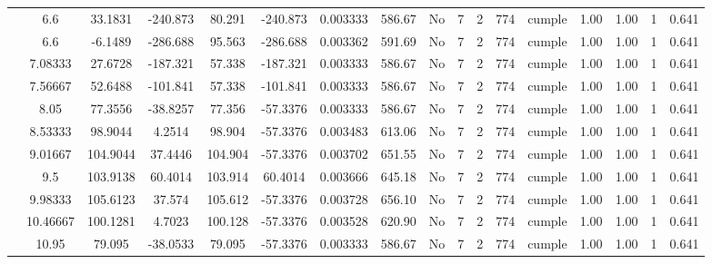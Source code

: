 \begin{table}[H]
{\begin{tabular}{|c|c|c|c|c|c|c|c|c|c|c|c|c|c|c|c|c|}
\cline{2-17}        & \cellcolor[rgb]{ .851,  .882,  .949}6.6 & 33.1831 & -240.873 & 80.291 & -240.873 & 0.003333 & 586.67 & No  & 7   & 2   & 774 & \cellcolor[rgb]{ .776,  .937,  .808}cumple & 1.00 & 1.00 & 1   & 0.641 \bigstrut\\
\cline{2-17}        & \cellcolor[rgb]{ .851,  .882,  .949}6.6 & -6.1489 & -286.688 & 95.563 & -286.688 & 0.003362 & 591.69 & No  & 7   & 2   & 774 & \cellcolor[rgb]{ .776,  .937,  .808}cumple & 1.00 & 1.00 & 1   & 0.641 \bigstrut\\
\cline{2-17}        & 7.08333 & 27.6728 & -187.321 & 57.338 & -187.321 & 0.003333 & 586.67 & No  & 7   & 2   & 774 & \cellcolor[rgb]{ .776,  .937,  .808}cumple & 1.00 & 1.00 & 1   & 0.641 \bigstrut\\
\cline{2-17}        & 7.56667 & 52.6488 & -101.841 & 57.338 & -101.841 & 0.003333 & 586.67 & No  & 7   & 2   & 774 & \cellcolor[rgb]{ .776,  .937,  .808}cumple & 1.00 & 1.00 & 1   & 0.641 \bigstrut\\
\cline{2-17}        & 8.05 & 77.3556 & -38.8257 & 77.356 & -57.3376 & 0.003333 & 586.67 & No  & 7   & 2   & 774 & \cellcolor[rgb]{ .776,  .937,  .808}cumple & 1.00 & 1.00 & 1   & 0.641 \bigstrut\\
\cline{2-17}        & 8.53333 & 98.9044 & 4.2514 & 98.904 & -57.3376 & 0.003483 & 613.06 & No  & 7   & 2   & 774 & \cellcolor[rgb]{ .776,  .937,  .808}cumple & 1.00 & 1.00 & 1   & 0.641 \bigstrut\\
\cline{2-17}        & 9.01667 & 104.9044 & 37.4446 & 104.904 & -57.3376 & 0.003702 & 651.55 & No  & 7   & 2   & 774 & \cellcolor[rgb]{ .776,  .937,  .808}cumple & 1.00 & 1.00 & 1   & 0.641 \bigstrut\\
\cline{2-17}        & 9.5 & 103.9138 & 60.4014 & 103.914 & 60.4014 & 0.003666 & 645.18 & No  & 7   & 2   & 774 & \cellcolor[rgb]{ .776,  .937,  .808}cumple & 1.00 & 1.00 & 1   & 0.641 \bigstrut\\
\cline{2-17}        & 9.98333 & 105.6123 & 37.574 & 105.612 & -57.3376 & 0.003728 & 656.10 & No  & 7   & 2   & 774 & \cellcolor[rgb]{ .776,  .937,  .808}cumple & 1.00 & 1.00 & 1   & 0.641 \bigstrut\\
\cline{2-17}        & 10.46667 & 100.1281 & 4.7023 & 100.128 & -57.3376 & 0.003528 & 620.90 & No  & 7   & 2   & 774 & \cellcolor[rgb]{ .776,  .937,  .808}cumple & 1.00 & 1.00 & 1   & 0.641 \bigstrut\\
\cline{2-17}        & 10.95 & 79.095 & -38.0533 & 79.095 & -57.3376 & 0.003333 & 586.67 & No  & 7   & 2   & 774 & \cellcolor[rgb]{ .776,  .937,  .808}cumple & 1.00 & 1.00 & 1   & 0.641 \bigstrut\\

\end{tabular}}
\end{table}
